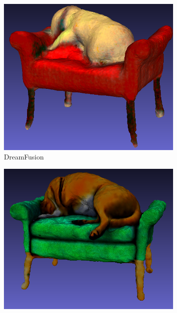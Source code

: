 \begin{figure}[ht]
    \centering
    \small
    \begin{subfigure}[b]{0.291\textwidth}
        \centering
        \includegraphics[width=\textwidth]{etc/a high-quality rendering of a big dog sleeping on a chair/dreamfusion/dreamfusion_dog_back_result.png}
        \caption{DreamFusion}
        \vspace{0.1cm}
    \end{subfigure}
    \begin{subfigure}[b]{0.3\textwidth}
        \centering
        \includegraphics[width=\textwidth]{etc/a high-quality rendering of a big dog sleeping on a chair/magic3d/magic3D_dog_back_result.png}

\end{subfigure}
\end{figure}

